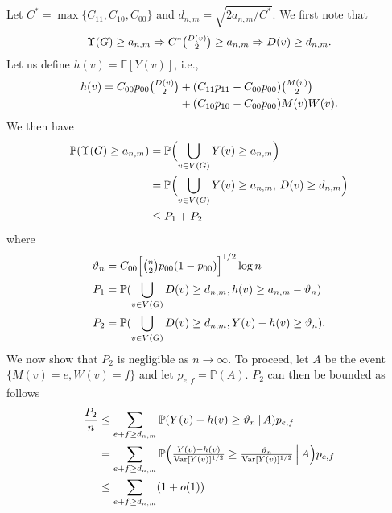 \documentclass[10pt,journal,compsoc]{IEEEtran}
\theoremstyle{definition}
\begin{document}
\begin{IEEEproof}[Lemma~8]
\begin{IEEEproof}[Eq.~\eqref{eq:27}]
 Let $C^{*} = \max\{C_{11},
C_{10}, C_{00}\}$ and $d_{n,m} = \sqrt{2 a_{n,m}/C^{*}}$. We first
note that
\begin{equation*}
\Upsilon(G) \geq a_{n,m} \Rightarrow C^{*} \tbinom{D(v)}{2} \geq
a_{n,m} \Rightarrow D(v) \geq d_{n,m}.
\end{equation*}
Let us define $h(v) = \mathbb{E}[Y(v)]$, i.e., 
\begin{equation*}
  \begin{split}
  h(v) = C_{00}p_{00} \tbinom{D(v)}{2} &+ (C_{11} p_{11} - C_{00}
  p_{00}) \tbinom{M(v)}{2} \\ &+ (C_{10} p_{10} - C_{00} p_{00}) M(v)
  W(v).
  \end{split}
\end{equation*}
We then have
  \begin{equation*}
    \label{eq:31}
    \begin{split}
    \mathbb{P}(\Upsilon(G) \geq a_{n,m}) &= \mathbb{P}\Bigl( \bigcup_{v
      \in V(G)} Y(v) \geq a_{n,m}\Bigr) \\
    &= \mathbb{P}\Bigl( \bigcup_{v
      \in V(G)} Y(v) \geq a_{n,m}, \, D(v) \geq d_{n,m} \Bigr) \\
    &\leq P_1 + P_2
    \end{split}
  \end{equation*}
  where 
  \begin{align*}
    \vartheta_n &= C_{00} \Bigl[ \tbinom{n}{2} p_{00} (1 -
    p_{00})\Bigr]^{1/2} \log{n} \\
    P_1 &= \mathbb{P}(\bigcup_{v \in V(G)} D(v) \geq d_{n,m}, h(v) \geq
    a_{n,m} - \vartheta_n) \\
    P_2 &= \mathbb{P}(\bigcup_{v \in V(G)} D(v) \geq d_{n,m},
    Y(v) - h(v) \geq \vartheta_n).
  \end{align*}
  We now show that $P_2$ is negligible as $n \rightarrow \infty$. To
  proceed, let $A$ be the event $\{M(v) = e, W(v) = f\}$ and let
  $p_{e,f} = \mathbb{P}(A)$. $P_2$ can then be bounded as follows
\begin{equation*}
  \begin{split}
    \frac{P_2}{n} & \leq \sum_{e + f \geq
        d_{n,m}}{\mathbb{P}( Y(v) - h(v) \geq
      \vartheta_{n} \, | \, A)} p_{e,f}  \\
  &=  \sum_{e + f \geq d_{n,m}}{\mathbb{P}\Bigl(
    \tfrac{Y(v) - h(v)}{\mathrm{Var}[Y(v)]^{1/2}} \geq
    \tfrac{\vartheta_n}{\mathrm{Var}[Y(v)]^{1/2}} \, \Bigl| \, A\Bigr) p_{e,f}} \\
    &\leq \sum_{e + f \geq d_{n,m}} (1 + o(1))

\end{split}
\end{equation*}
\end{IEEEproof}
\end{IEEEproof}
\end{document}
